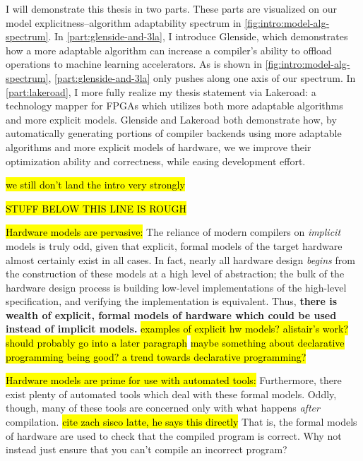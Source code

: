 \vspace{10mm}

I will demonstrate this thesis
  in two parts.
These parts are visualized on
  our model explicitness--algorithm adaptability
  spectrum in
  \cref{fig:intro:model-alg-spectrum}.
In \cref{part:glenside-and-3la},
  I introduce Glenside,
  which demonstrates how
  a more adaptable algorithm
  can increase a compiler's
  ability to offload operations
  to machine learning accelerators.
As is shown in
  \cref{fig:intro:model-alg-spectrum},
  \cref{part:glenside-and-3la}
  only pushes along one axis 
  of our spectrum.
In \cref{part:lakeroad}, I
  more fully realize
  my thesis statement
  via Lakeroad:
  a technology mapper for FPGAs
  which utilizes both more
  adaptable algorithms
  and
  more explicit models.
Glenside and Lakeroad
  both demonstrate
  how,
  by automatically generating
  portions of compiler backends
  using more adaptable algorithms
  and more explicit models of hardware,
  we we improve their
  optimization ability and
  correctness, while
  easing development effort.

\hl{we still don't land the intro very strongly}

\hl{STUFF BELOW THIS LINE IS ROUGH}

\hl{Hardware models are pervasive:}
The reliance of modern compilers
  on \textit{implicit} models is truly odd, 
  given that
  explicit, formal models
  of the target hardware
  almost certainly exist
  in all cases.
In fact, nearly all hardware design
  \textit{begins} from the construction
  of these models
  at a high level of abstraction;
  the bulk of the hardware design process
  is building low-level implementations
  of the high-level specification,
  and verifying the implementation
  is equivalent.
Thus, \textbf{there is wealth
  of explicit, formal models of hardware
  which could be used
  instead of implicit models.}
\hl{examples of explicit hw models? alistair's work?
should probably go into a later paragraph}
\hl{maybe something about declarative programming being good?
a trend towards declarative programming?}

\hl{Hardware models are prime for use with automated tools:}
Furthermore, 
  there exist plenty of automated
  tools
  which deal with
  these formal models.
Oddly, though,
  many of these tools
  are concerned only with
  what happens \textit{after}
  compilation.
\hl{cite zach sisco latte, he says this directly}
That is, the formal models
  of hardware
  are used to check that 
  the compiled program is correct.
Why not instead
  just ensure
  that you can't compile an incorrect
  program?


